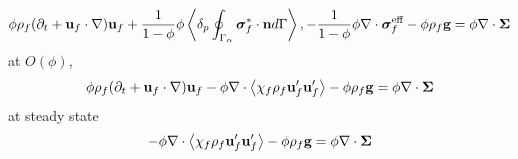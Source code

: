 \documentclass[12pt]{My_preprint}
\begin{document}
\begin{equation}
    \phi  \rho_f(\partial_t + \textbf{u}_f  \cdot \mathbf{\nabla}) \textbf{u}_f
    + \frac{1}{1-\phi}\phi \left<\delta_{p} \oint_{\Gamma_{\alpha}} \bm\sigma_f^{*}\cdot \textbf{n} d\Gamma\right>, 
     - \frac{1}{1-\phi}\phi \mathbf{\nabla}\cdot \bm\sigma_f^{\text{eff}}
     - \phi 
     \rho_f \textbf{g}
    = \phi  
    \mathbf{\nabla}\cdot \bm{\Sigma}
\end{equation}
at $O(\phi)$,
\begin{equation}
    \phi  \rho_f(\partial_t + \textbf{u}_f  \cdot \mathbf{\nabla}) \textbf{u}_f
     - \phi \mathbf{\nabla}\cdot \left<\chi_f\rho_f \textbf{u}_f'\textbf{u}_f'\right> 
     - \phi 
     \rho_f \textbf{g}
    = \phi  
    \mathbf{\nabla}\cdot \bm{\Sigma}
\end{equation}
at steady state
\begin{equation}
     - \phi \mathbf{\nabla}\cdot \left<\chi_f\rho_f \textbf{u}_f'\textbf{u}_f'\right> 
     - \phi 
     \rho_f \textbf{g}
    = \phi  
    \mathbf{\nabla}\cdot \bm{\Sigma}
\end{equation}
\end{document}
